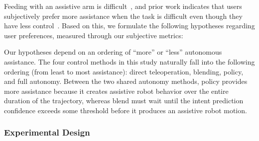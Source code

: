

Feeding with an assistive arm is difficult~\citep{herlant_2016}, and prior work indicates that users subjectively prefer more assistance when the task is difficult even though they have less control~\citep{you_2011, dragan_2013_assistive}. Based on this, we formulate the following hypotheses regarding user preferences, measured through our subjective metrics:




Our hypotheses depend on an ordering of ``more'' or ``less'' autonomous assistance. The four control methods in this study naturally fall into the following ordering (from least to most assistance): direct teleoperation, blending, policy, and full autonomy. Between the two shared autonomy methods, policy provides more assistance because it creates assistive robot behavior over the entire duration of the trajectory, whereas blend must wait until the intent prediction confidence exceeds some threshold before it produces an assistive robot motion. %

\subsubsection{Experimental Design}
\label{sec:experiment_hri_2016_design}

